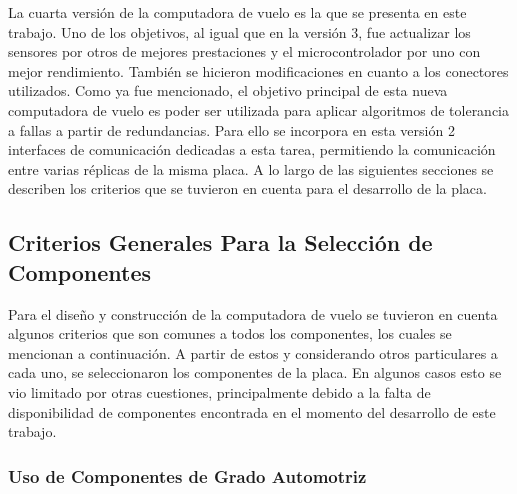 La cuarta versión de la computadora de vuelo es la que se presenta en este trabajo. Uno de los objetivos, al igual que en la versión 3, fue actualizar los sensores por otros de mejores prestaciones y el microcontrolador por uno con mejor rendimiento. También se hicieron modificaciones en cuanto a los conectores utilizados. Como ya fue mencionado, el objetivo principal de esta nueva computadora de vuelo es poder ser utilizada para aplicar algoritmos de tolerancia a fallas a partir de redundancias. Para ello se incorpora en esta versión 2 interfaces de comunicación dedicadas a esta tarea, permitiendo la comunicación entre varias réplicas de la misma placa. A lo largo de las siguientes secciones se describen los criterios que se tuvieron en cuenta para el desarrollo de la placa.

\subsection{Criterios Generales Para la Selección de Componentes}


Para el diseño y construcción de la computadora de vuelo se tuvieron en cuenta algunos criterios que son comunes a todos los componentes, los cuales se mencionan a continuación. A partir de estos y considerando otros particulares a cada uno, se seleccionaron los componentes de la placa. En algunos casos esto se vio limitado por otras cuestiones, principalmente debido a la falta de disponibilidad de componentes encontrada en el momento del desarrollo de este trabajo.



\subsubsection{Uso de Componentes de Grado Automotriz}


